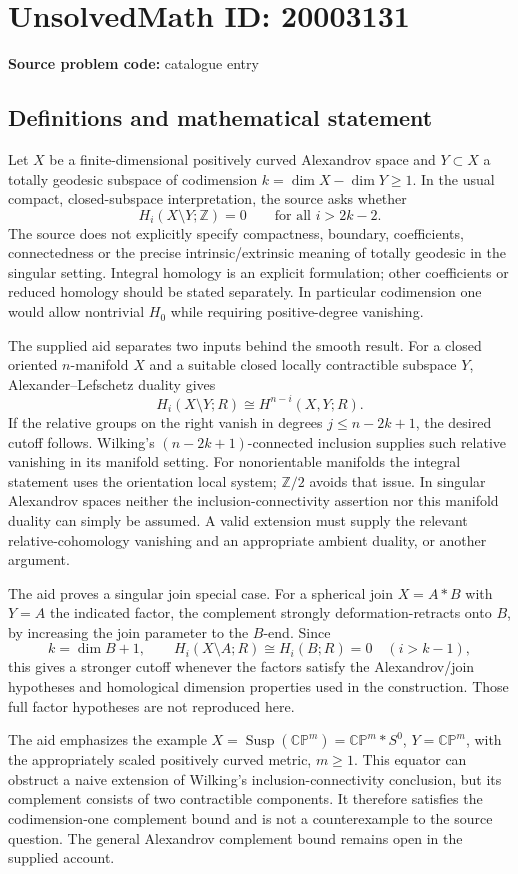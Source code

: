 \documentclass[11pt]{article}
\newcommand{\Z}{\mathbb{Z}}
\newcommand{\C}{\mathbb{C}}
\newcommand{\PP}{\mathbb{P}}
\begin{document}
\section*{UnsolvedMath ID: 20003131}
\textbf{Source problem code:} catalogue entry
\subsection{Definitions and mathematical statement}
Let \(X\) be a finite-dimensional positively curved Alexandrov space and \(Y\subset X\) a totally geodesic subspace of codimension \(k=\dim X-\dim Y\ge1\). In the usual compact, closed-subspace interpretation, the source asks whether
\[
H_i(X\setminus Y;\Z)=0\qquad\text{for all }i>2k-2.
\]
The source does not explicitly specify compactness, boundary, coefficients, connectedness or the precise intrinsic/extrinsic meaning of totally geodesic in the singular setting. Integral homology is an explicit formulation; other coefficients or reduced homology should be stated separately. In particular codimension one would allow nontrivial \(H_0\) while requiring positive-degree vanishing.

The supplied aid separates two inputs behind the smooth result. For a closed oriented \(n\)-manifold \(X\) and a suitable closed locally contractible subspace \(Y\), Alexander--Lefschetz duality gives
\[
H_i(X\setminus Y;R)\cong H^{n-i}(X,Y;R).
\]
If the relative groups on the right vanish in degrees \(j\le n-2k+1\), the desired cutoff follows. Wilking's \((n-2k+1)\)-connected inclusion supplies such relative vanishing in its manifold setting. For nonorientable manifolds the integral statement uses the orientation local system; \(\Z/2\) avoids that issue. In singular Alexandrov spaces neither the inclusion-connectivity assertion nor this manifold duality can simply be assumed. A valid extension must supply the relevant relative-cohomology vanishing and an appropriate ambient duality, or another argument.

The aid proves a singular join special case. For a spherical join \(X=A*B\) with \(Y=A\) the indicated factor, the complement strongly deformation-retracts onto \(B\), by increasing the join parameter to the \(B\)-end. Since
\[
k=\dim B+1,
\qquad H_i(X\setminus A;R)\cong H_i(B;R)=0\quad(i>k-1),
\]
this gives a stronger cutoff whenever the factors satisfy the Alexandrov/join hypotheses and homological dimension properties used in the construction. Those full factor hypotheses are not reproduced here.

The aid emphasizes the example \(X=\operatorname{Susp}(\C\PP^m)=\C\PP^m*S^0\), \(Y=\C\PP^m\), with the appropriately scaled positively curved metric, \(m\ge1\). This equator can obstruct a naive extension of Wilking's inclusion-connectivity conclusion, but its complement consists of two contractible components. It therefore satisfies the codimension-one complement bound and is not a counterexample to the source question. The general Alexandrov complement bound remains open in the supplied account.
\end{document}
